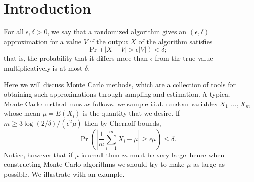 \section{Introduction}
For all $\epsilon, \delta > 0$, we say that a randomized algorithm gives an $(\epsilon, \delta)$ approximation for a value $V$ if the output $X$ of the algorithm satisfies
\[\Pr (|X - V| > \epsilon |V|) < \delta;\]
that is, the probability that it differs more than $\epsilon$ from the true value multiplicatively is at most $\delta$.

Here we will discuss Monte Carlo methods, which are a collection of tools for obtaining such approximations through sampling and estimation. A typical Monte Carlo method runs as follows: we sample i.i.d. random variables $X_1, \ldots, X_m$ whose mean $\mu = E(X_i)$ is the quantity that we desire. If $m \geq 3 \log (2 / \delta) / (\epsilon^2 \mu)$ then by Chernoff bounds,
\[\Pr \left( \left| \frac{1}{m} \sum_{i = 1}^m X_i - \mu \right| \geq \epsilon \mu \right) \leq \delta.\]
Notice, however that if $\mu$ is small then $m$ must be very large--hence when constructing Monte Carlo algorithms we should try to make $\mu$ as large as possible. We illustrate with an example.
